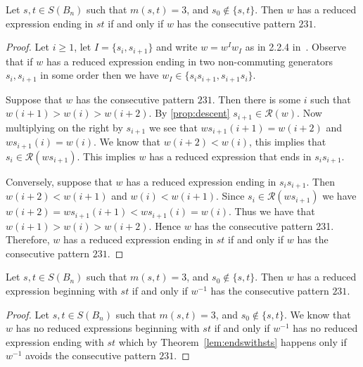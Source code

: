 \begin{lemma}\label{lem:ts}
Let $s,t \in S(B_n)$ such that $m(s,t)=3$, and $s_0 \notin \{s,t\}.$ Then $w$ has a reduced expression ending in $st$ if and only if $w$ has the consecutive pattern $231$.
\begin{proof}
	Let $i \geq 1$, let $I=\{s_i,s_{i+1}\}$ and write $w=w^Iw_I$ as in 2.2.4 in~\cite{Bjorner2005}. Observe that if $w$ has a reduced expression ending in two non-commuting generators $s_i, s_{i+1}$ in some order then we have $w_I \in \{s_is_{i+1}, s_{i+1}s_i\}$.
	
	Suppose that $w$ has the consecutive pattern $231$. Then there is some $i$ such that $w(i+1)>w(i)>w(i+2)$. By \ref{prop:descent} $s_{i+1} \in \mathcal{R}(w)$. Now multiplying on the right by $s_{i+1}$ we see that $ws_{i+1}(i+1)=w(i+2)$ and $ws_{i+1}(i)=w(i)$. We know that $w(i+2)<w(i)$, this implies that $s_i \in \mathcal{R}(ws_{i+1})$. This implies $w$ has a reduced expression that ends in $s_is_{i+1}$.
	
	 Conversely, suppose that $w$ has a reduced expression ending in $s_is_{i+1}$. Then $w(i+2)<w(i+1)$ and $w(i)<w(i+1)$. Since $s_i \in \mathcal{R}(ws_{i+1})$ we have $w(i+2)=ws_{i+1}(i+1)<ws_{i+1}(i)=w(i)$. Thus we have that $w(i+1) > w(i) > w(i+2)$. Hence $w$ has the consecutive pattern 231.
	Therefore, $w$ has a reduced expression ending in $st$ if and only if $w$ has the consecutive pattern $231$.
\end{proof}	
\end{lemma}

\begin{corollary}\label{lem:endswithst}
	Let $s,t \in S(B_n)$ such that $m(s,t)=3$, and $s_0 \notin\{s,t\}$. Then $w$ has a reduced expression beginning with $st$ if and only if $w^{-1}$ has the consecutive pattern $231$.
	\begin{proof}
		Let $s,t \in S(B_n)$ such that $m(s,t)=3$, and $s_0 \notin\{s,t\}$. We know that $w$ has no reduced expressions beginning with $st$ if and only if $w^{-1}$ has no reduced expression ending with $st$ which by Theorem~\ref{lem:endswithsts} happens only if $w^{-1}$ avoids the consecutive pattern $231$.
	\end{proof}
\end{corollary}

